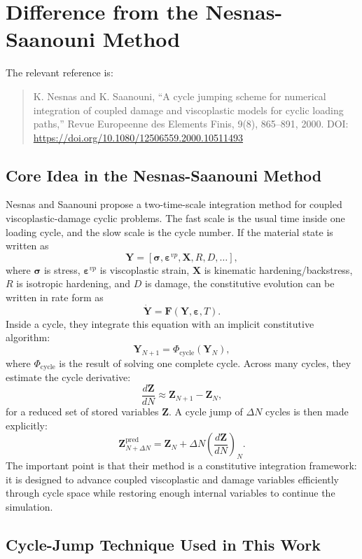 \documentclass[11pt,a4paper]{article}
\begin{document}
\section{Difference from the Nesnas-Saanouni Method}

The relevant reference is:

\begin{quote}
K. Nesnas and K. Saanouni, ``A cycle jumping scheme for numerical integration of coupled damage and viscoplastic models for cyclic loading paths,'' Revue Europeenne des Elements Finis, 9(8), 865--891, 2000. DOI: \url{https://doi.org/10.1080/12506559.2000.10511493}
\end{quote}

\subsection{Core Idea in the Nesnas-Saanouni Method}

Nesnas and Saanouni propose a two-time-scale integration method for coupled viscoplastic-damage cyclic problems. The fast scale is the usual time inside one loading cycle, and the slow scale is the cycle number. If the material state is written as
\[
\mathbf{Y}
=
\left[
\boldsymbol{\sigma},
\boldsymbol{\varepsilon}^{vp},
\mathbf{X},
R,
D,
\ldots
\right],
\]
where $\boldsymbol{\sigma}$ is stress, $\boldsymbol{\varepsilon}^{vp}$ is viscoplastic strain, $\mathbf{X}$ is kinematic hardening/backstress, $R$ is isotropic hardening, and $D$ is damage, the constitutive evolution can be written in rate form as
\[
\dot{\mathbf{Y}}=\mathbf{F}\left(\mathbf{Y},\boldsymbol{\varepsilon},T\right).
\]
Inside a cycle, they integrate this equation with an implicit constitutive algorithm:
\[
\mathbf{Y}_{N+1}
=
\Phi_{\mathrm{cycle}}\left(\mathbf{Y}_{N}\right),
\]
where $\Phi_{\mathrm{cycle}}$ is the result of solving one complete cycle. Across many cycles, they estimate the cycle derivative:
\[
\frac{d\mathbf{Z}}{dN}
\approx
\mathbf{Z}_{N+1}-\mathbf{Z}_{N},
\]
for a reduced set of stored variables $\mathbf{Z}$. A cycle jump of $\Delta N$ cycles is then made explicitly:
\[
\mathbf{Z}_{N+\Delta N}^{\mathrm{pred}}
=
\mathbf{Z}_{N}
+
\Delta N
\left(\frac{d\mathbf{Z}}{dN}\right)_{N}.
\]
The important point is that their method is a constitutive integration framework: it is designed to advance coupled viscoplastic and damage variables efficiently through cycle space while restoring enough internal variables to continue the simulation.

\subsection{Cycle-Jump Technique Used in This Work}
\end{document}
